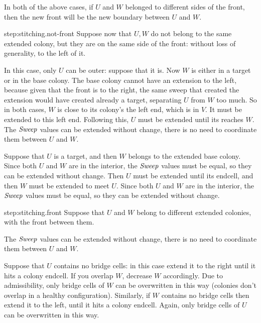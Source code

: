 \documentclass[11pt]{memoir}
\theoremstyle{definition} %
\newcommand{\fld}[1]{\ensuremath{\textit{#1\/}}}
\newcommand{\Sweep}{\fld{Sweep}}
\begin{document}
\begin{Proof}
\begin{prooof}
In both of the above cases, if \( U  \) and \( W \) belonged to different sides of the front, then the
new front will be the new boundary between \( U \) and \( W \).
\end{prooof} %

\begin{step+}{step:stitching.not-front}
Suppose now that \( U,W \) do not belong to the same extended colony, but they are on 
the same side of the front: without loss of generality, to the left of it.
\end{step+}
\begin{prooof}
In this case, only \( U \) can be outer: suppose that it is.
Now \( W \) is either in a target or in the base colony.
The base colony cannot have an extension to the left, because given that the front
is to the right, the same sweep that created the extension would have created already a target, 
separating \( U \) from \( W \) too much.
So in both cases, \( W \) is close to its colony's the left end, which is in \( V \).
It must be extended to this left end.
Following this, \( U \) must be extended until its reaches \( W \).
The \( \Sweep \) values can be extended without change, there is no need to coordinate them
between \( U \) and \( W \).

Suppose that \( U \) is a target, and then \( W \) belongs to the extended base colony.
Since both \( U \) and \( W \) are in the interior, the \( \Sweep \) values must be equal, so they
can be extended without change.
Then \( U \) must be extended until its endcell, and then \( W \) must be extended to meet \( U \).
Since both \( U \) and \( W \) are in the interior, the \( \Sweep \) values must be equal, so they
can be extended without change.
\end{prooof} %

\begin{step+}{step:stitching.front}
Suppose that \( U \) and \( W \) belong to different extended colonies, with the front between them.
\end{step+}
\begin{prooof}
The \( \Sweep \) values can be extended without change, there is no need to coordinate them
between \( U \) and \( W \).

Suppose that \( U \) contains no bridge cells: in this case extend it to the right until it hits
a colony endcell.
If you overlap \( W \), decrease \( W \) accordingly.
Due to admissibility, only bridge cells of \( W \) can be overwritten in this way
(colonies don't overlap in a healthy configuration).
Similarly, if \( W \) contains no bridge cells then extend it to the left, until it hits a colony endcell.
Again, only bridge cells of \( U \) can be overwritten in this way.


\end{prooof}
\end{Proof}
\end{document}
